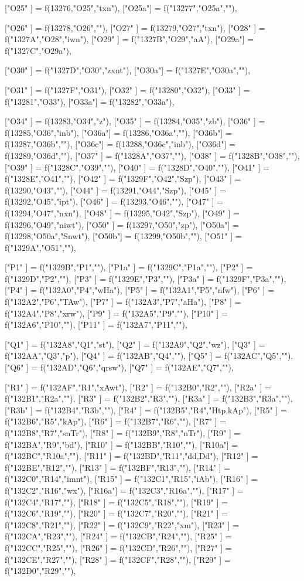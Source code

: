 {["O25" ] = f(13276,"O25","txn"),
["O25a"] = f("13277","O25a",""),

["O26" ] = f(13278,"O26",""),
["O27" ] = f(13279,"O27","txn"),
["O28" ] = f("1327A","O28","iwn"),
["O29" ] = f("1327B","O29","aA"),
["O29a"] = f("1327C","O29a"),

["O30" ] = f("1327D","O30","zxnt"),
["O30a"] = f("1327E","O30a",""),

["O31" ] = f("1327F","O31"),
["O32" ] = f("13280","O32"),
["O33" ] = f("13281","O33"),
["O33a"] = f("13282","O33a"),

["O34" ] = f(13283,"O34","z"),
["O35" ] = f(13284,"O35","zb"),
["O36" ] = f(13285,"O36","inb"),
["O36a"] = f(13286,"O36a",""),
["O36b"] = f(13287,"O36b",""),
["O36c"] = f(13288,"O36c","inb"),
["O36d"] = f(13289,"O36d",""),
["O37" ] = f("1328A","O37",""),
["O38" ] = f("1328B","O38",""),
["O39" ] = f("1328C","O39",""),
["O40" ] = f("1328D","O40",""),
["O41" ] = f("1328E","O41",""),
["O42" ] = f("1329F","O42","Szp"),
["O43" ] = f(13290,"O43",""),
["O44" ] = f(13291,"O44","Szp"),
["O45" ] = f(13292,"O45","ipt"),
["O46" ] = f(13293,"O46",""),
["O47" ] = f(13294,"O47","nxn"),
["O48" ] = f(13295,"O42","Szp"),
["O49" ] = f(13296,"O49","niwt"),
["O50" ] = f(13297,"O50","zp"),
["O50a"] = f(13298,"O50a","Snwt"),
["O50b"] = f(13299,"O50b",""),
["O51" ] = f("1329A","O51",""),

["P1"  ] = f("1329B","P1",""),
["P1a" ] = f("1329C","P1a",""),
["P2"  ] = f("1329D","P2",""),
["P3"  ] = f("1329E","P3",""),
["P3a" ] = f("1329F","P3a",""),
["P4"  ] = f("132A0","P4","wHa"),
["P5"  ] = f("132A1","P5","nfw"),
["P6"  ] = f("132A2","P6","TAw"),
["P7"  ] = f("132A3","P7","aHa"),
["P8"  ] = f("132A4","P8","xrw"),
["P9"  ] = f("132A5","P9",""),
["P10" ] = f("132A6","P10",""),
["P11" ] = f("132A7","P11",""),

["Q1"  ] = f("132A8","Q1","st"),
["Q2"  ] = f("132A9","Q2","wz"),
["Q3"  ] = f("132AA","Q3","p"),
["Q4"  ] = f("132AB","Q4",""),
["Q5"  ] = f("132AC","Q5",""),
["Q6"  ] = f("132AD","Q6","qrsw"),
["Q7"  ] = f("132AE","Q7",""),

["R1"  ] = f("132AF","R1","xAwt"),
["R2"  ] = f("132B0","R2",""),
["R2a" ] = f("132B1","R2a",""),
["R3"  ] = f("132B2","R3",""),
["R3a" ] = f("132B3","R3a",""),
["R3b" ] = f("132B4","R3b",""),
["R4"  ] = f("132B5","R4","Htp,kAp"),
["R5"  ] = f("132B6","R5","kAp"),
["R6"  ] = f("132B7","R6",""),
["R7"  ] = f("132B8","R7","snTr"),
["R8"  ] = f("132B9","R8","nTr"),
["R9"  ] = f("132BA","R9","bd"),
["R10" ] = f("132BB","R10",""),
["R10a"] = f("132BC","R10a",""),
["R11" ] = f("132BD","R11","dd,Dd"),
["R12" ] = f("132BE","R12",""),
["R13" ] = f("132BF","R13",""),
["R14" ] = f("132C0","R14","imnt"),
["R15" ] = f("132C1","R15","iAb"),
["R16" ] = f("132C2","R16","wx"),
["R16a"] = f("132C3","R16a",""),
["R17" ] = f("132C4","R17",""),
["R18" ] = f("132C5","R18",""),
["R19" ] = f("132C6","R19",""),
["R20" ] = f("132C7","R20",""),
["R21" ] = f("132C8","R21",""),
["R22" ] = f("132C9","R22","xm"),
["R23" ] = f("132CA","R23",""),
["R24" ] = f("132CB","R24",""),
["R25" ] = f("132CC","R25",""),
["R26" ] = f("132CD","R26",""),
["R27" ] = f("132CE","R27",""),
["R28" ] = f("132CF","R28",""),
["R29" ] = f("132D0","R29",""),

}
